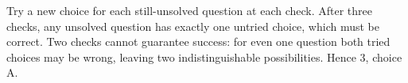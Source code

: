 Try a new choice for each still-unsolved question at each check. After three checks, any unsolved question has exactly one untried choice, which must be correct. Two checks cannot guarantee success: for even one question both tried choices may be wrong, leaving two indistinguishable possibilities. Hence $\boxed3 $, choice A.
